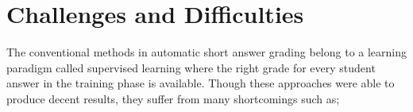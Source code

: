 %

\section{Challenges and Difficulties}

The conventional methods in automatic short answer grading belong to a learning paradigm called supervised learning where the right grade for every student answer in the training phase is available. Though these approaches were able to produce decent results, they suffer from many shortcomings such as;

